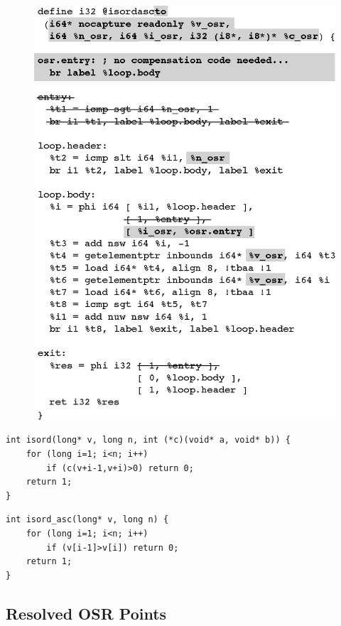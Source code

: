 \ifdefined\noauthorea
\begin{figure}[t]
\begin{center}
\includegraphics[width=0.9\columnwidth]{figures/isordascto/isordascto.eps}
\caption{\protect}
\end{center}
\end{figure}
\fi

\begin{verbatim}
int isord(long* v, long n, int (*c)(void* a, void* b)) {
    for (long i=1; i<n; i++) 
        if (c(v+i-1,v+i)>0) return 0;
    return 1;
}
\end{verbatim}

\begin{verbatim}
int isord_asc(long* v, long n) {
    for (long i=1; i<n; i++) 
        if (v[i-1]>v[i]) return 0;
    return 1;
}
\end{verbatim}

\subsection{Resolved OSR Points}

